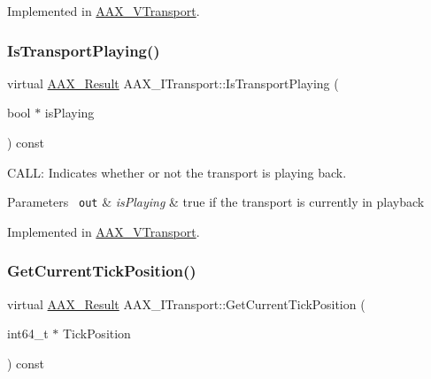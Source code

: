 Implemented in \mbox{\hyperlink{a01941_a95785b25a81811427d08132e4fb11858}{A\+A\+X\+\_\+\+V\+Transport}}.

\mbox{\label{a01885_a8f7d5b8f65ff9dd456a395838c974715}} 
\subsubsection{\texorpdfstring{IsTransportPlaying()}{IsTransportPlaying()}}
{\footnotesize\ttfamily virtual \mbox{\hyperlink{a00392_a4d8f69a697df7f70c3a8e9b8ee130d2f}{A\+A\+X\+\_\+\+Result}} A\+A\+X\+\_\+\+I\+Transport\+::\+Is\+Transport\+Playing (\begin{DoxyParamCaption}\item[{bool $\ast$}]{is\+Playing }\end{DoxyParamCaption}) const\hspace{0.3cm}{\ttfamily [pure virtual]}}



C\+A\+LL\+: Indicates whether or not the transport is playing back. 


\begin{DoxyParams}[1]{Parameters}
\mbox{\texttt{ out}}  & {\em is\+Playing} & {\ttfamily true} if the transport is currently in playback \\
\hline
\end{DoxyParams}


Implemented in \mbox{\hyperlink{a01941_a69c0acbc3e5a18e1a8ffb690eb00da79}{A\+A\+X\+\_\+\+V\+Transport}}.

\mbox{\label{a01885_a2d99dca311ddca98c4d455078edd42d5}} 
\subsubsection{\texorpdfstring{GetCurrentTickPosition()}{GetCurrentTickPosition()}}
{\footnotesize\ttfamily virtual \mbox{\hyperlink{a00392_a4d8f69a697df7f70c3a8e9b8ee130d2f}{A\+A\+X\+\_\+\+Result}} A\+A\+X\+\_\+\+I\+Transport\+::\+Get\+Current\+Tick\+Position (\begin{DoxyParamCaption}\item[{int64\+\_\+t $\ast$}]{Tick\+Position }\end{DoxyParamCaption}) const\hspace{0.3cm}{\ttfamily [pure virtual]}}



